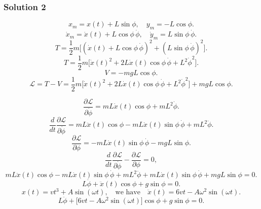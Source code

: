\documentclass{article}
\begin{document}
\subsubsection{Solution 2}
\[
x_m = x(t) + L\sin\phi,\quad y_m = -L\cos\phi.
\]
\[
\dot{x}_m = \dot{x}(t) + L\cos\phi\,\dot{\phi},\quad \dot{y}_m = L\sin\phi\,\dot{\phi}.
\]
\[
T = \frac{1}{2}m\Big[(\dot{x}(t)+L\cos\phi\,\dot{\phi})^2 + (L\sin\phi\,\dot{\phi})^2\Big].
\]
\[
T = \frac{1}{2}m\Big[\dot{x}(t)^2 + 2L\dot{x}(t)\cos\phi\,\dot{\phi} + L^2\dot{\phi}^2\Big].
\]
\[
V = -mgL\cos\phi.
\]
\[
\mathcal{L} = T - V = \frac{1}{2}m\Big[\dot{x}(t)^2 + 2L\dot{x}(t)\cos\phi\,\dot{\phi} + L^2\dot{\phi}^2\Big] + mgL\cos\phi.
\]

\[
\frac{\partial\mathcal{L}}{\partial\dot{\phi}} = mL\dot{x}(t)\cos\phi + mL^2\dot{\phi}.
\]
\[
\frac{d}{dt}\frac{\partial\mathcal{L}}{\partial\dot{\phi}} = mL\ddot{x}(t)\cos\phi - mL\dot{x}(t)\sin\phi\,\dot{\phi} + mL^2\ddot{\phi}.
\]
\[
\frac{\partial\mathcal{L}}{\partial\phi} = -mL\dot{x}(t)\sin\phi\,\dot{\phi} - mgL\sin\phi.
\]
\[
\frac{d}{dt}\frac{\partial\mathcal{L}}{\partial\dot{\phi}} - \frac{\partial\mathcal{L}}{\partial\phi} = 0,
\]
\[
mL\ddot{x}(t)\cos\phi - mL\dot{x}(t)\sin\phi\,\dot{\phi} + mL^2\ddot{\phi} + mL\dot{x}(t)\sin\phi\,\dot{\phi} + mgL\sin\phi = 0.
\]
\[
L\ddot{\phi} + \ddot{x}(t)\cos\phi + g\sin\phi = 0.
\]
\[
x(t) = vt^3 + A\sin(\omega t),\quad \text{we have} \quad \ddot{x}(t) = 6vt - A\omega^2\sin(\omega t).
\]
\[
\boxed{L\ddot{\phi} + \Big[6vt - A\omega^2\sin(\omega t)\Big]\cos\phi + g\sin\phi = 0.}
\]
\end{document}
